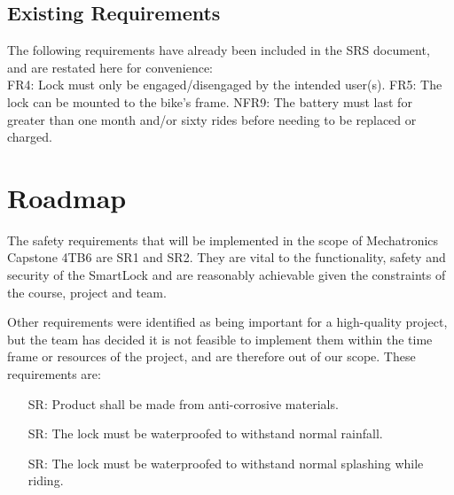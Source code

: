 \documentclass{article}
\newcounter{srnum} %
\begin{document}
\subsection{Existing Requirements}

The following requirements have already been included in the SRS document, and are restated here for convenience: \\

 \noindent FR4: Lock must only be engaged/disengaged by the intended user(s). \newline 
 FR5: The lock can be mounted to the bike's frame. \newline
 NFR9: The battery must last for greater than one month and/or sixty rides before needing to be replaced or charged. \\


\section{Roadmap}
The safety requirements that will be implemented in the scope of Mechatronics Capstone 4TB6 are SR1 and SR2. They are vital to the functionality, safety and security of the SmartLock and are reasonably achievable given the constraints of the course, project and team. 

Other requirements were identified as being important for a high-quality project, but the team has decided it is not feasible to implement them within the time frame or resources of the project, and are therefore out of our scope. These requirements are:

\begin{itemize}
\item[SR\refstepcounter{srnum}\thesrnum\label{SR3}:] Product shall be made from anti-corrosive materials. %
\item[SR\refstepcounter{srnum}\thesrnum\label{SR4}:] The lock must be waterproofed to withstand normal rainfall.
\item[SR\refstepcounter{srnum}\thesrnum\label{SR5}:] The lock must be waterproofed to withstand normal splashing while riding.
\end{itemize}
 
\end{document}
